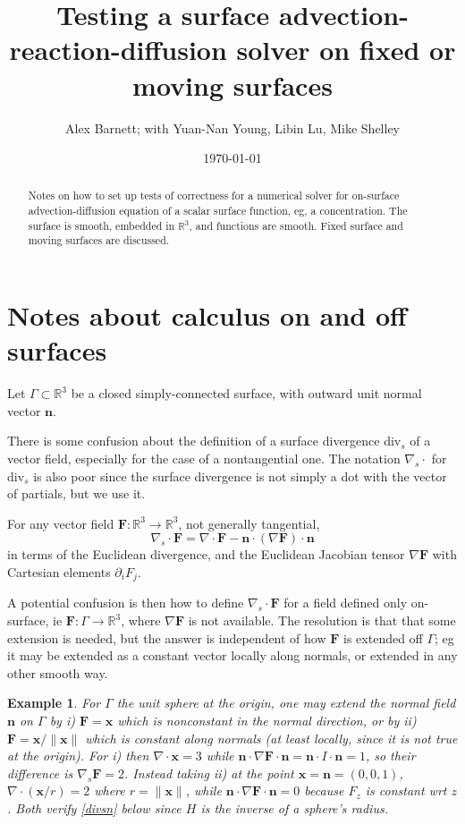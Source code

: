 \documentclass[11pt]{article}
\newcommand{\be}{\begin{equation}}
\newcommand{\ee}{\end{equation}}
\newcommand{\mbf}[1]{{\mathbf #1}}
\newcommand{\R}{\mathbb{R}}
\newtheorem{exa}[thm]{Example}
\newcommand{\x}{\mbf{x}}
\newcommand{\n}{\mbf{n}}
\begin{document}
\title{Testing a surface advection-reaction-diffusion solver on fixed or moving surfaces}
\author{Alex Barnett; with Yuan-Nan Young, Libin Lu, Mike Shelley}
\date{\today}
\maketitle
\begin{abstract}
  Notes on how to set up tests of correctness for a numerical solver
  for on-surface advection-diffusion equation of a scalar surface function,
  eg, a concentration.
  The surface is smooth, embedded in $\R^3$, and functions are smooth.
  Fixed surface and moving surfaces are discussed.
\end{abstract}

\section{Notes about calculus on and off surfaces}
\label{s:calc}

Let $\Gamma \subset \R^3$ be a closed simply-connected surface,
with outward unit normal vector $\n$.

There is some confusion about the definition of a surface divergence
div$_s$ of a
vector field, especially for the case of a nontangential one.
The notation $\nabla_s \cdot$ for div$_s$ is also poor since the
surface divergence is not simply a dot with the vector of partials,
but we use it.

For any vector field $\mbf{F}:\R^3\to\R^3$, not generally tangential,
\be
\nabla_s \cdot \mbf{F} = 
\nabla \cdot \mbf{F} - \n\cdot(\nabla \mbf{F}) \cdot \n
\label{divs}
\ee
in terms of the Euclidean divergence, and the Euclidean Jacobian tensor
$\nabla \mbf{F}$ with Cartesian elements $\partial_i F_j$.

A potential confusion is then how to define 
$\nabla_s \cdot \mbf{F}$ for a field defined only on-surface,
ie $\mbf{F}:\Gamma \to \R^3$, where $\nabla \mbf{F}$ is not available.
The resolution is that that some extension is needed, but the
answer is independent of how $\mbf{F}$
is extended off $\Gamma$; eg it may be extended as a constant vector
locally along normals, or extended in any other smooth way.


\begin{exa}
  For $\Gamma$ the unit sphere at the origin, one may extend the normal
  field $\n$ on $\Gamma$ by
  i) $\mbf{F} = \x$ which is nonconstant in the normal direction,
  or by ii) $\mbf{F} = \x/\|\x\|$ which is constant along normals
  (at least locally, since it is not true at the origin).
  For i) then $\nabla\cdot\x = 3$ while $\n\cdot\nabla\mbf{F}\cdot\n =
  \n\cdot I \cdot \n = 1$, so their difference is $\nabla_s\mbf{F} = 2$.
  Instead taking ii) at the point $\x=\n =(0,0,1)$,
$\nabla\cdot (\x/r) = 2$ where $r=\|\x\|$, while $\n\cdot\nabla\mbf{F}\cdot\n = 0$ because $F_z$ is constant wrt $z$.
  Both verify \eqref{divsn} below since $H$ is the inverse of a sphere's radius.
\end{exa}
\end{document}
